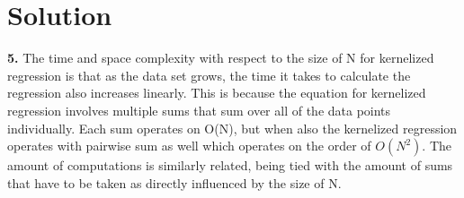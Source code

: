 \documentclass[submit]{harvardml}
\newenvironment{solution}
  {\color{blue}\section*{Solution}}
{}
\begin{document}
\begin{solution}
  \textbf{5.} The time and space complexity with respect to the size of N for kernelized regression is that 
  as the data set grows, the time it takes to calculate the regression also increases linearly. This is because the equation for 
  kernelized regression involves multiple sums that sum over all of the data points individually. Each sum operates on O(N), but when also 
  the kernelized regression operates with pairwise sum as well which operates on the order of $O(N^2)$. The amount of computations is similarly related, 
  being tied with the amount of sums that have to be taken as directly influenced by the size of N.
\end{solution}
\newpage

\end{document}
